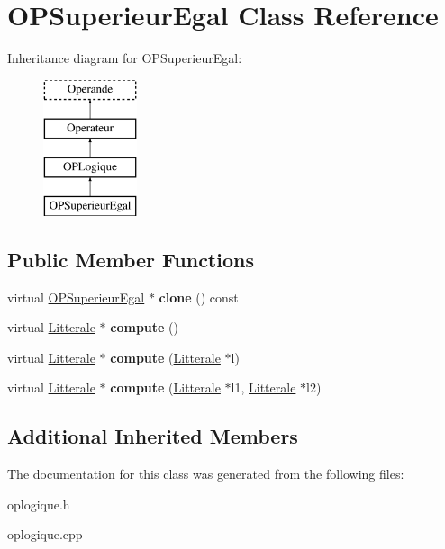 \hypertarget{class_o_p_superieur_egal}{}\section{O\+P\+Superieur\+Egal Class Reference}
\label{class_o_p_superieur_egal}
Inheritance diagram for O\+P\+Superieur\+Egal\+:\begin{figure}[H]
\begin{center}
\leavevmode
\includegraphics[height=4.000000cm]{class_o_p_superieur_egal}
\end{center}
\end{figure}
\subsection*{Public Member Functions}
\begin{DoxyCompactItemize}
\item 
virtual \hyperlink{class_o_p_superieur_egal}{O\+P\+Superieur\+Egal} $\ast$ {\bfseries clone} () const \hypertarget{class_o_p_superieur_egal_a676bc0c7dcce000f16d0277284345642}{}\label{class_o_p_superieur_egal_a676bc0c7dcce000f16d0277284345642}

\item 
virtual \hyperlink{class_litterale}{Litterale} $\ast$ {\bfseries compute} ()\hypertarget{class_o_p_superieur_egal_a0d47eca022c03018d035b965f50f0dd5}{}\label{class_o_p_superieur_egal_a0d47eca022c03018d035b965f50f0dd5}

\item 
virtual \hyperlink{class_litterale}{Litterale} $\ast$ {\bfseries compute} (\hyperlink{class_litterale}{Litterale} $\ast$l)\hypertarget{class_o_p_superieur_egal_a8f54937140dc99025ff96824f6a3a41c}{}\label{class_o_p_superieur_egal_a8f54937140dc99025ff96824f6a3a41c}

\item 
virtual \hyperlink{class_litterale}{Litterale} $\ast$ {\bfseries compute} (\hyperlink{class_litterale}{Litterale} $\ast$l1, \hyperlink{class_litterale}{Litterale} $\ast$l2)\hypertarget{class_o_p_superieur_egal_aedb75bbbf56e3e3b9dbe81c7cba71a30}{}\label{class_o_p_superieur_egal_aedb75bbbf56e3e3b9dbe81c7cba71a30}

\end{DoxyCompactItemize}
\subsection*{Additional Inherited Members}


The documentation for this class was generated from the following files\+:\begin{DoxyCompactItemize}
\item 
oplogique.\+h\item 
oplogique.\+cpp\end{DoxyCompactItemize}

